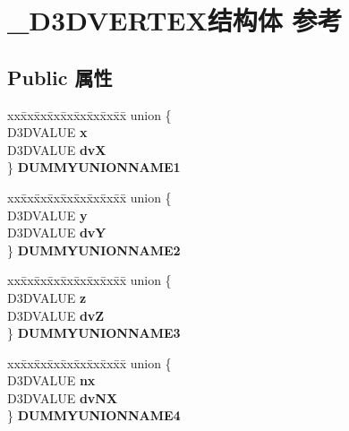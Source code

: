 \hypertarget{struct___d3_d_v_e_r_t_e_x}{}\section{\+\_\+\+D3\+D\+V\+E\+R\+T\+E\+X结构体 参考}
\label{struct___d3_d_v_e_r_t_e_x}
\subsection*{Public 属性}
\begin{DoxyCompactItemize}
\item 
\mbox{\label{struct___d3_d_v_e_r_t_e_x_ac15fb769539b4f7d976de4251b8266ba}} 
\begin{tabbing}
xx\=xx\=xx\=xx\=xx\=xx\=xx\=xx\=xx\=\kill
union \{\\
\>D3DVALUE {\bfseries x}\\
\>D3DVALUE {\bfseries dvX}\\
\} {\bfseries DUMMYUNIONNAME1}\\

\end{tabbing}\item 
\mbox{\label{struct___d3_d_v_e_r_t_e_x_a3fcda273bd6c94e57ad72b8192afa4e8}} 
\begin{tabbing}
xx\=xx\=xx\=xx\=xx\=xx\=xx\=xx\=xx\=\kill
union \{\\
\>D3DVALUE {\bfseries y}\\
\>D3DVALUE {\bfseries dvY}\\
\} {\bfseries DUMMYUNIONNAME2}\\

\end{tabbing}\item 
\mbox{\label{struct___d3_d_v_e_r_t_e_x_ad99b6a0a5a25469f2d56d7c9e50a13bb}} 
\begin{tabbing}
xx\=xx\=xx\=xx\=xx\=xx\=xx\=xx\=xx\=\kill
union \{\\
\>D3DVALUE {\bfseries z}\\
\>D3DVALUE {\bfseries dvZ}\\
\} {\bfseries DUMMYUNIONNAME3}\\

\end{tabbing}\item 
\mbox{\label{struct___d3_d_v_e_r_t_e_x_a9d955b46e4089bcb09181b7f508c2176}} 
\begin{tabbing}
xx\=xx\=xx\=xx\=xx\=xx\=xx\=xx\=xx\=\kill
union \{\\
\>D3DVALUE {\bfseries nx}\\
\>D3DVALUE {\bfseries dvNX}\\
\} {\bfseries DUMMYUNIONNAME4}\\


\end{tabbing}
\end{DoxyCompactItemize}
